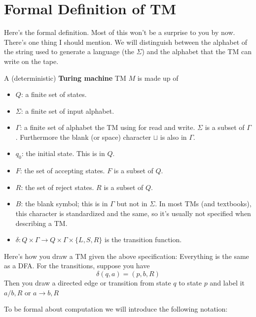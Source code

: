 \newcommand\BOT{\operatorname{\text{\texttt{\$}}}} %
\newcommand\EOT{\operatorname{\text{\texttt{!}}}} %

\section{Formal Definition of TM}

Here's the formal definition. Most of this won't be a surprise to
you by now. There's one thing I should mention. We will distinguish
between the alphabet of the string used to generate a language (the
$\Sigma$) and the alphabet that the TM can write on the tape.

\begin{defn}
A (deterministic) \textbf{Turing machine} TM $M$ is made up of
\begin{itemize}
 \item $Q$: a finite set of states.
 \item $\Sigma$: a finite set of input alphabet.
 \item $\Gamma$: a finite set of alphabet the TM using for read and write.
 $\Sigma$ is a subset of $\Gamma$.
 Furthermore the blank (or space) character $\sqcup$ is also in $\Gamma$.
 \item $q_0$: the initial state. This is in $Q$.
 \item $F$: the set of accepting states. $F$ is a subset of $Q$.
 \item $R$: the set of reject states. $R$ is a subset of $Q$.
 \item $B$: the blank symbol; this is in $\Gamma$ but not in $\Sigma$.
 In most TMs (and textbooks), this character is standardized and the same, 
 so it's usually not specified when describing a TM.
 \item $\delta : Q \times \Gamma \rightarrow Q 
\times \Gamma \times \{L, S, R\}$ is the transition function.
\end{itemize}
\end{defn}


Here's how you draw a TM given the above specification: Everything
is the same as a DFA. For the transitions, suppose you have
\[
 \delta(q, a) = (p, b, R)
\]
Then you draw a directed edge or transition from state $q$ to
state $p$ and label it $a/b, R$ or $a \rightarrow b, R$

To be formal about computation we will introduce the following
notation:

